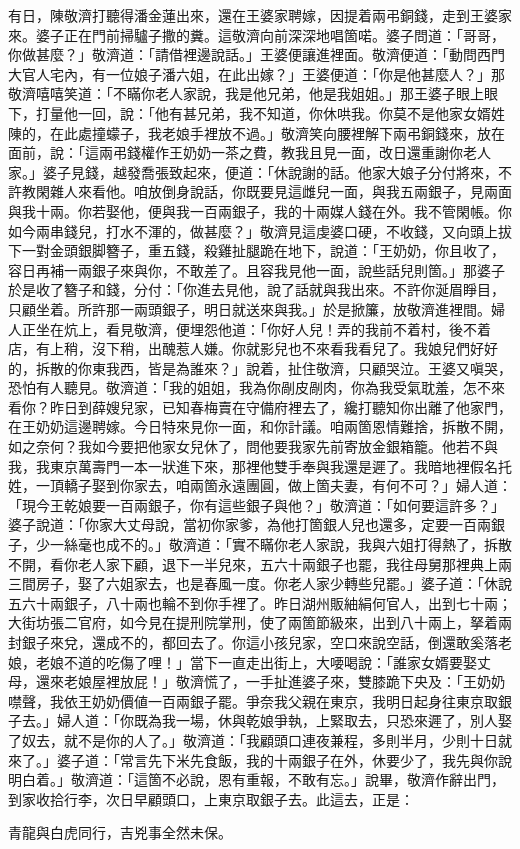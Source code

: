 有日，陳敬濟打聽得潘金蓮出來，還在王婆家聘嫁，因提着兩弔銅錢，走到王婆家來。婆子正在門前掃驢子撒的糞。這敬濟向前深深地唱箇喏。婆子問道：「哥哥，你做甚麼？」敬濟道：「請借裡邊說話。」王婆便讓進裡面。敬濟便道：「動問西門大官人宅內，有一位娘子潘六姐，在此出嫁？」王婆便道：「你是他甚麼人？」那敬濟嘻嘻笑道：「不瞞你老人家說，我是他兄弟，他是我姐姐。」那王婆子眼上眼下，打量他一回，說：「他有甚兄弟，我不知道，你休哄我。你莫不是他家女婿姓陳的，在此處撞蠓子，{}我老娘手裡放不過。」敬濟笑向腰裡解下兩弔銅錢來，放在面前，說：「這兩弔錢權作王奶奶一茶之費，教我且見一面，改日還重謝你老人家。」婆子見錢，越發喬張致起來，便道：「休說謝的話。他家大娘子分付將來，不許教閑雜人來看他。咱放倒身說話，你既要見這雌兒一面，與我五兩銀子，見兩面與我十兩。你若娶他，便與我一百兩銀子，我的十兩媒人錢在外。{}我不管閑帳。你如今兩串錢兒，打水不渾的，做甚麼？」敬濟見這虔婆口硬，不收錢，又向頭上拔下一對金頭銀脚簪子，重五錢，殺雞扯腿跪在地下，說道：「王奶奶，你且收了，容日再補一兩銀子來與你，不敢差了。且容我見他一面，說些話兒則箇。」那婆子於是收了簪子和錢，分付：「你進去見他，說了話就與我出來。不許你涎眉睜目，只顧坐着。{}所許那一兩頭銀子，明日就送來與我。」於是掀簾，放敬濟進裡間。婦人正坐在炕上，看見敬濟，便埋怨他道：「你好人兒！弄的我前不着村，後不着店，有上稍，沒下稍，出醜惹人嫌。你就影兒也不來看我看兒了。我娘兒們好好的，拆散的你東我西，皆是為誰來？」說着，扯住敬濟，只顧哭泣。王婆又嗔哭，恐怕有人聽見。敬濟道：「我的姐姐，我為你剮皮剮肉，你為我受氣耽羞，怎不來看你？昨日到薛嫂兒家，已知春梅賣在守備府裡去了，纔打聽知你出離了他家門，在王奶奶這邊聘嫁。今日特來見你一面，和你計議。咱兩箇恩情難捨，拆散不開，如之奈何？我如今要把他家女兒休了，問他要我家先前寄放金銀箱籠。他若不與我，我東京萬壽門一本一狀進下來，那裡他雙手奉與我還是遲了。我暗地裡假名托姓，一頂轎子娶到你家去，咱兩箇永遠團圓，做上箇夫妻，有何不可？」婦人道：「現今王乾娘要一百兩銀子，你有這些銀子與他？」敬濟道：「如何要這許多？」婆子說道：「你家大丈母說，當初你家爹，為他打箇銀人兒也還多，定要一百兩銀子，少一絲毫也成不的。」敬濟道：「實不瞞你老人家說，我與六姐打得熱了，拆散不開，看你老人家下顧，退下一半兒來，五六十兩銀子也罷，我往母舅那裡典上兩三間房子，娶了六姐家去，也是春風一度。你老人家少轉些兒罷。」婆子道：「休說五六十兩銀子，八十兩也輪不到你手裡了。昨日湖州販紬絹何官人，{}出到七十兩；大街坊張二官府，如今見在提刑院掌刑，使了兩箇節級來，出到八十兩上，拏着兩封銀子來兌，還成不的，都回去了。你這小孩兒家，空口來說空話，倒還敢奚落老娘，老娘不道的吃傷了哩！」當下一直走出街上，大喓喝說：「誰家女婿要娶丈母，還來老娘屋裡放屁！」{}敬濟慌了，一手扯進婆子來，雙膝跪下央及：「王奶奶噤聲，我依王奶奶價値一百兩銀子罷。爭奈我父親在東京，我明日起身往東京取銀子去。」婦人道：「你既為我一場，休與乾娘爭執，上緊取去，只恐來遲了，別人娶了奴去，就不是你的人了。」敬濟道：「我顧頭口連夜兼程，多則半月，少則十日就來了。」婆子道：「常言先下米先食飯，我的十兩銀子在外，休要少了，{}我先與你說明白着。」敬濟道：「這箇不必說，恩有重報，不敢有忘。」說畢，敬濟作辭出門，到家收拾行李，次日早顧頭口，上東京取銀子去。此這去，正是：

\begin{myquote}
青龍與白虎同行，吉兇事全然未保。
\end{myquote}

